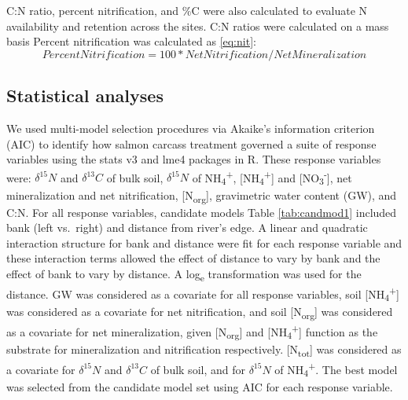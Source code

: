 \documentclass [11pt, proquest] {uwthesis}[2015/03/03]
\begin{document}
C:N ratio, percent nitrification, and \%C were also calculated to
evaluate N availability and retention across the sites. C:N ratios were
calculated on a mass basis Percent nitrification was calculated as
\eqref{eq:nit}:
\begin{equation} 
 Percent Nitrification =100 * Net Nitrification / Net Mineralization 
  \label{eq:nit}
\end{equation}
\subsection{Statistical analyses}\label{statistical-analyses}

We used multi-model selection procedures via Akaike's information
criterion (AIC) to identify how salmon carcass treatment governed a
suite of response variables using the stats v3 and lme4 packages in R.
These response variables were: \(\delta^{15}N\) and \(\delta^{13}C\) of
bulk soil, \(\delta^{15}N\) of NH\textsubscript{4}\textsuperscript{+},
{[}NH\textsubscript{4}\textsuperscript{+}{]} and
{[}NO\textsubscript{3}\textsuperscript{-}{]}, net mineralization and net
nitrification, {[}N\textsubscript{org}{]}, gravimetric water content
(GW), and C:N. For all response variables, candidate models Table
\ref{tab:candmod1} included bank (left vs.~right) and distance from
river's edge. A linear and quadratic interaction structure for bank and
distance were fit for each response variable and these interaction terms
allowed the effect of distance to vary by bank and the effect of bank to
vary by distance. A log\textsubscript{e} transformation was used for the
distance. GW was considered as a covariate for all response variables,
soil {[}NH\textsubscript{4}\textsuperscript{+}{]} was considered as a
covariate for net nitrification, and soil {[}N\textsubscript{org}{]} was
considered as a covariate for net mineralization, given
{[}N\textsubscript{org}{]} and
{[}NH\textsubscript{4}\textsuperscript{+}{]} function as the substrate
for mineralization and nitrification respectively.
{[}N\textsubscript{tot}{]} was considered as a covariate for
\(\delta^{15}N\) and \(\delta^{13}C\) of bulk soil, and for
\(\delta^{15}N\) of NH\textsubscript{4}\textsuperscript{+}. The best
model was selected from the candidate model set using AIC for each
response variable.
\end{document}
